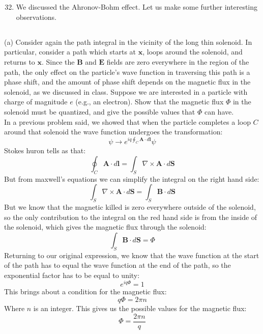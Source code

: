 \documentclass[12pt]{article}
\begin{document}
\section{}
\begin{enumerate}
  \setcounter{enumi}{31}
  \item We discussed the Ahronov-Bohm effect. Let us make some further interesting observations.
\end{enumerate}
\subsection{}
(a) Consider again the path integral in the vicinity of the long thin solenoid. In particular, consider a path which starts at $\boldsymbol{x}$, loops around the solenoid, and returns to $\boldsymbol{x}$. Since the $\boldsymbol{B}$ and $\boldsymbol{E}$ fields are zero everywhere in the region of the path, the only effect on the particle's wave function in traversing this path is a phase shift, and the amount of phase shift depends on the magnetic flux in the solenoid, as we discussed in class. Suppose we are interested in a particle with charge of magnitude $e$ (e.g., an electron). Show that the magnetic flux $\Phi$ in the solenoid must be quantized, and give the possible values that $\Phi$ can have.\\
In a previous problem said, we showed that when the particle completes a loop $C$ around that solenoid the wave function undergoes the transformation:
\begin{equation}
\psi \rightarrow e^{i q \oint_C \boldsymbol{A} \cdot d \boldsymbol{l}} \psi
\end{equation}
Stokes huron tells as that:
\begin{equation}
\oint_C \boldsymbol{A} \cdot d \boldsymbol{l} = \int_S \nabla \times \boldsymbol{A} \cdot d \boldsymbol{S}
\end{equation}
But from maxwell's equations we can simplify the integral on the right hand side:
\begin{equation}
\int_S \nabla \times \boldsymbol{A} \cdot d \boldsymbol{S} = \int_S \boldsymbol{B} \cdot d \boldsymbol{S}
\end{equation}
But we know that the magnetic killed is zero everywhere outside of the solenoid, so the only contribution to the integral on the red hand side is from the inside of the solenoid, which gives the magnetic flux through the solenoid:
\begin{equation}
\int_S \boldsymbol{B} \cdot d \boldsymbol{S} = \Phi
\end{equation}
Returning to our original expression, we know that the wave function at the start of the path has to equal the wave function at the end of the path, so the exponential factor has to be equal to unity:
\begin{equation}
e^{i q \Phi} = 1
\end{equation}
This brings about a condition for the magnetic flux:
\begin{equation}
q \Phi = 2 \pi n
\end{equation}
Where $n$ is an integer. This gives us the possible values for the magnetic flux:
\begin{equation}
\Phi = \frac{2 \pi n}{q}
\end{equation}
\end{document}
